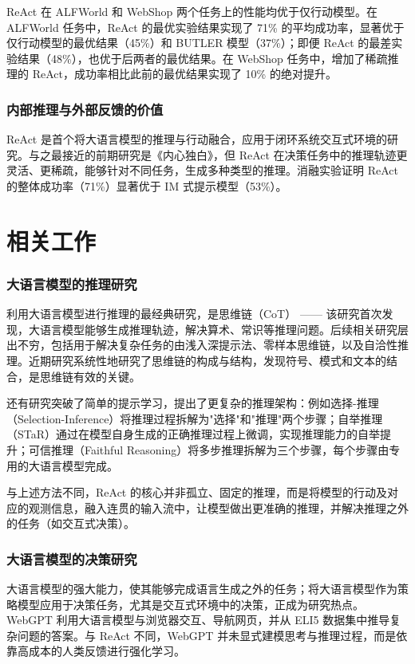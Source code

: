 ReAct 在 ALFWorld 和 WebShop 两个任务上的性能均优于仅行动模型。在 ALFWorld 任务中，ReAct 的最优实验结果实现了 71\% 的平均成功率，显著优于仅行动模型的最优结果（45\%）和 BUTLER 模型（37\%）；即便 ReAct 的最差实验结果（48\%），也优于后两者的最优结果。在 WebShop 任务中，增加了稀疏推理的 ReAct，成功率相比此前的最优结果实现了 10\% 的绝对提升。

\subsubsection*{内部推理与外部反馈的价值}

ReAct 是首个将大语言模型的推理与行动融合，应用于闭环系统交互式环境的研究。与之最接近的前期研究是《内心独白》，但 ReAct 在决策任务中的推理轨迹更灵活、更稀疏，能够针对不同任务，生成多种类型的推理。消融实验证明 ReAct 的整体成功率（71\%）显著优于 IM 式提示模型（53\%）。

\section{相关工作}

\subsubsection*{大语言模型的推理研究}

利用大语言模型进行推理的最经典研究，是思维链（CoT） —— 该研究首次发现，大语言模型能够生成推理轨迹，解决算术、常识等推理问题。后续相关研究层出不穷，包括用于解决复杂任务的由浅入深提示法、零样本思维链，以及自洽性推理。近期研究系统性地研究了思维链的构成与结构，发现符号、模式和文本的结合，是思维链有效的关键。

还有研究突破了简单的提示学习，提出了更复杂的推理架构：例如选择-推理（Selection-Inference）将推理过程拆解为"选择"和"推理"两个步骤；自举推理（STaR）通过在模型自身生成的正确推理过程上微调，实现推理能力的自举提升；可信推理（Faithful Reasoning）将多步推理拆解为三个步骤，每个步骤由专用的大语言模型完成。

与上述方法不同，ReAct 的核心并非孤立、固定的推理，而是将模型的行动及对应的观测信息，融入连贯的输入流中，让模型做出更准确的推理，并解决推理之外的任务（如交互式决策）。

\subsubsection*{大语言模型的决策研究}

大语言模型的强大能力，使其能够完成语言生成之外的任务；将大语言模型作为策略模型应用于决策任务，尤其是交互式环境中的决策，正成为研究热点。WebGPT 利用大语言模型与浏览器交互、导航网页，并从 ELI5 数据集中推导复杂问题的答案。与 ReAct 不同，WebGPT 并未显式建模思考与推理过程，而是依靠高成本的人类反馈进行强化学习。


